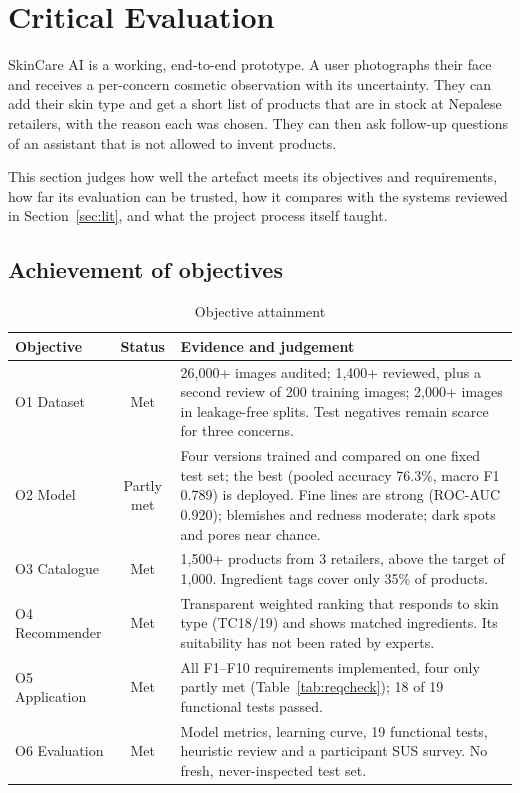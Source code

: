\section{Critical Evaluation}
\label{sec:eval}

SkinCare AI is a working, end-to-end prototype. A user photographs their face and receives a per-concern cosmetic observation with its uncertainty. They can add their skin type and get a short list of products that are in stock at Nepalese retailers, with the reason each was chosen. They can then ask follow-up questions of an assistant that is not allowed to invent products.

This section judges how well the artefact meets its objectives and requirements, how far its evaluation can be trusted, how it compares with the systems reviewed in Section~\ref{sec:lit}, and what the project process itself taught.

\subsection*{Achievement of objectives}

\begin{table}[ht]
\centering\small
\caption{Objective attainment}
\label{tab:objectives}
\begin{tabularx}{\linewidth}{lcY}
\toprule
\textbf{Objective} & \textbf{Status} & \textbf{Evidence and judgement}\\
\midrule
O1 Dataset & Met & 26,000+ images audited; 1,400+ reviewed, plus a second review of 200 training images; 2,000+ images in leakage-free splits. Test negatives remain scarce for three concerns.\\
O2 Model & Partly met & Four versions trained and compared on one fixed test set; the best (pooled accuracy 76.3\%, macro F1 0.789) is deployed. Fine lines are strong (ROC-AUC 0.920); blemishes and redness moderate; dark spots and pores near chance.\\
O3 Catalogue & Met & 1,500+ products from 3 retailers, above the target of 1,000. Ingredient tags cover only 35\% of products.\\
O4 Recommender & Met & Transparent weighted ranking that responds to skin type (TC18/19) and shows matched ingredients. Its suitability has not been rated by experts.\\
O5 Application & Met & All F1--F10 requirements implemented, four only partly met (Table~\ref{tab:reqcheck}); 18 of 19 functional tests passed.\\
O6 Evaluation & Met & Model metrics, learning curve, 19 functional tests, heuristic review and a participant SUS survey. No fresh, never-inspected test set.\\
\bottomrule
\end{tabularx}
\end{table}

